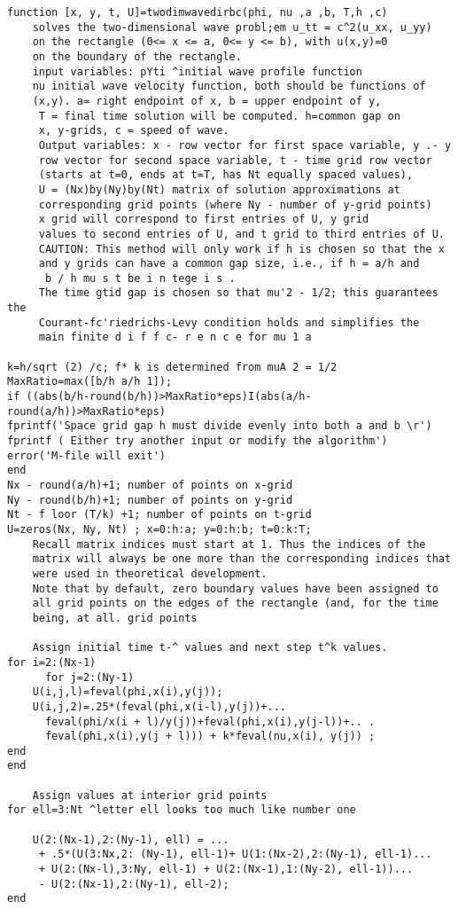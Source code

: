 \documentclass[../main.tex]{subfiles}
\begin{document}
\begin{lstlisting}[numbers=none,frame=none]
 function [x, y, t, U]=twodimwavedirbc(phi, nu ,a ,b, T,h ,c)
 	solves the two-dimensional wave probl;em u_tt = c^2(u_xx, u_yy)
 	on the rectangle (0<= x <= a, 0<= y <= b), with u(x,y)=0
 	on the boundary of the rectangle. 
	input variables: pYti ^initial wave profile function 
	nu initial wave velocity function, both should be functions of 
	(x,y). a= right endpoint of x, b = upper endpoint of y, 
	 T = final time solution will be computed. h=common gap on 
	 x, y-grids, c = speed of wave. 
	 Output variables: x - row vector for first space variable, y .- y
	 row vector for second space variable, t - time grid row vector 
	 (starts at t=0, ends at t=T, has Nt equally spaced values), 
	 U = (Nx)by(Ny)by(Nt) matrix of solution approximations at 
	 corresponding grid points (where Ny - number of y-grid points) 
	 x grid will correspond to first entries of U, y grid 
	 values to second entries of U, and t grid to third entries of U. 
	 CAUTION: This method will only work if h is chosen so that the x 
	 and y grids can have a common gap size, i.e., if h = a/h and 
	  b / h mu s t be i n tege i s . 
	 The time gtid gap is chosen so that mu'2 - 1/2; this guarantees the 
	 Courant-fc'riedrichs-Levy condition holds and simplifies the 
	 main finite d i f f c- r e n c e for mu 1 a
	 
k=h/sqrt (2) /c; f* k is determined from muA 2 = 1/2 
MaxRatio=max([b/h a/h 1]); 
if ((abs(b/h-round(b/h))>MaxRatio*eps)I(abs(a/h-
round(a/h))>MaxRatio*eps)  
fprintf('Space grid gap h must divide evenly into both a and b \r') 
fprintf ( Either try another input or modify the algorithm') 
error('M-file will exit') 
end 
Nx - round(a/h)+1; number of points on x-grid 
Ny - round(b/h)+1; number of points on y-grid 
Nt - f loor (T/k) +1; number of points on t-grid 
U=zeros(Nx, Ny, Nt) ; x=0:h:a; y=0:h:b; t=0:k:T;
	Recall matrix indices must start at 1. Thus the indices of the 
	matrix will always be one more than the corresponding indices that 
	were used in theoretical development. 
	Note that by default, zero boundary values have been assigned to 
	all grid points on the edges of the rectangle (and, for the time 
	being, at all. grid points
	
	Assign initial time t-^ values and next step t^k values. 
for i=2:(Nx-1) 
	  for j=2:(Ny-1) 
	U(i,j,l)=feval(phi,x(i),y(j)); 
	U(i,j,2)=.25*(feval(phi,x(i-l),y(j))+... 
	  feval(phi/x(i + l)/y(j))+feval(phi,x(i),y(j-l))+.. . 
	  feval(phi,x(i),y(j + l))) + k*feval(nu,x(i), y(j)) ; 
end 
end 

	Assign values at interior grid points 
for ell=3:Nt ^letter ell looks too much like number one 

	U(2:(Nx-1),2:(Ny-1), ell) = ... 
	 + .5*(U(3:Nx,2: (Ny-1), ell-1)+ U(1:(Nx-2),2:(Ny-1), ell-1)... 
	 + U(2:(Nx-l),3:Ny, ell-1) + U(2:(Nx-1),1:(Ny-2), ell-1))... 
	 - U(2:(Nx-1),2:(Ny-1), ell-2); 
end 
\end{lstlisting}
\end{document}
